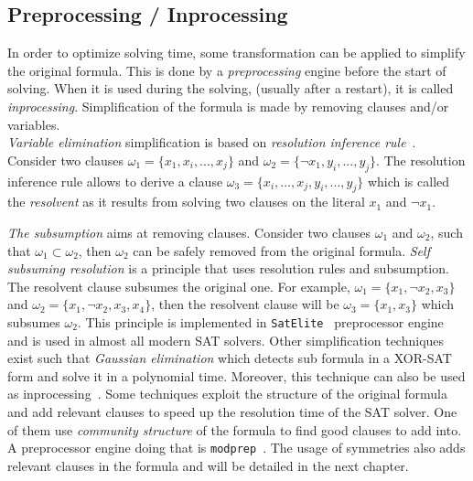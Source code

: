 \subsection{Preprocessing / Inprocessing}
In order to optimize solving time, some transformation can be applied to simplify the original formula.
This is done by a \emph{preprocessing} engine before the start of solving.
When it is used during the solving, (usually after a restart), it is called \emph{inprocessing}.
Simplification of the formula is made by removing clauses and/or variables.\\

\emph{Variable elimination} simplification is based on \emph{resolution inference rule}~\cite{robinson1965machine}.
Consider two clauses $\omega_1 = \{x_1, x_i, ..., x_j \}$ and $\omega_2 = \{\neg x_1, y_i, ..., y_j\}$.
The resolution inference rule allows to derive a clause $\omega_3 = \{x_i, ..., x_j, y_i, ..., y_j\}$ which is called
the \emph{resolvent} as it results from solving two clauses on the literal $x_1$ and $\neg x_1$.


\emph{The subsumption} aims at removing  clauses. Consider two clauses $\omega_1$ and $\omega_2$, such that
$\omega_1 \subset  \omega_2$, then $\omega_2$ can be safely removed from the original formula.
\emph{Self subsuming resolution} is a principle that uses resolution rules and subsumption.
The resolvent clause subsumes the original one. For example, $\omega_1 = \{x_1, \neg x_2, x_3\}$ and $\omega_2 = \{x_1, \neg x_2, x_3, x_4\}$,
 then the resolvent clause will be $\omega_3 = \{x_1, x_3\}$ which subsumes $\omega_2$. This principle
is implemented in \texttt{SatElite}~\cite{een2005effective} preprocessor engine and is used in almost all modern SAT solvers.
Other simplification techniques exist such that \emph{Gaussian elimination} which detects sub formula in a XOR-SAT
form and solve it in a polynomial time. Moreover, this technique can also be used as inprocessing~\cite{soos2010enhanced}. 
Some techniques exploit the structure of the original formula and add relevant clauses to speed up the resolution
time of the SAT solver. One of them use \textit{community structure} of the formula to find good clauses to add into.
A preprocessor engine doing that is  \texttt{modprep}~\cite{ansotegui2015using}.
The usage of symmetries also adds relevant clauses in the formula and will be detailed in the next chapter.

